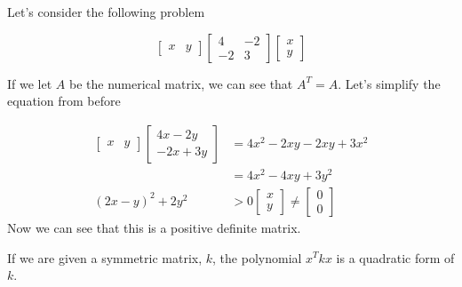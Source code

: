 	\begin{problem}
		Let's consider the following problem

		\begin{equation}
			\begin{bmatrix} x&y \end{bmatrix} \begin{bmatrix} 4&-2\\-2&3 \end{bmatrix} \begin{bmatrix} x\\y \end{bmatrix} 
		\end{equation}

		If we let $A$ be the numerical matrix, we can see that $A^{T}=A$. Let's simplify the equation from before

		\begin{align}
			\begin{bmatrix} x&y \end{bmatrix} \begin{bmatrix} 4x-2y\\-2x+3y \end{bmatrix}&=4x^2-2xy-2xy+3x^2\\
					 &=4x^2-4xy+3y^2\\
			(2x-y)^2+2y^2&>0\begin{bmatrix} x\\y \end{bmatrix} \neq\begin{bmatrix} 0\\0 \end{bmatrix} 
		\end{align}
		Now we can see that this is a positive definite matrix.
	\end{problem}
	If we are given a symmetric matrix, $k$, the polynomial $x^{T}kx$ is a quadratic form of $k$.

